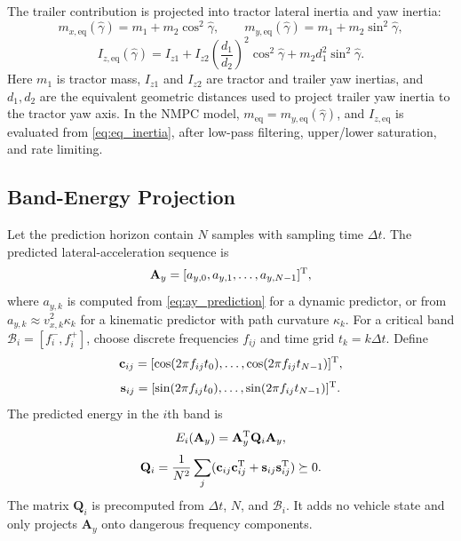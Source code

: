 The trailer contribution is projected into tractor lateral inertia and yaw inertia:
\begin{equation}
    m_{x,\mathrm{eq}}(\hat\gamma)=m_1+m_2\cos^2\hat\gamma,\qquad
    m_{y,\mathrm{eq}}(\hat\gamma)=m_1+m_2\sin^2\hat\gamma,
    \label{eq:eq_mass}
\end{equation}
\begin{equation}
    I_{z,\mathrm{eq}}(\hat\gamma)=I_{z1}
    +I_{z2}\left(\frac{d_1}{d_2}\right)^2\cos^2\hat\gamma
    +m_2d_1^2\sin^2\hat\gamma .
    \label{eq:eq_inertia}
\end{equation}
Here $m_1$ is tractor mass, $I_{z1}$ and $I_{z2}$ are tractor and trailer yaw inertias, and $d_1,d_2$ are the equivalent geometric distances used to project trailer yaw inertia to the tractor yaw axis. In the NMPC model, $m_{\mathrm{eq}}=m_{y,\mathrm{eq}}(\hat\gamma)$, and $I_{z,\mathrm{eq}}$ is evaluated from \eqref{eq:eq_inertia}, after low-pass filtering, upper/lower saturation, and rate limiting.

\subsection{Band-Energy Projection}
Let the prediction horizon contain $N$ samples with sampling time $\Delta t$. The predicted lateral-acceleration sequence is
\begin{equation}
    \mathbf{A}_y=[a_{y,0},a_{y,1},\ldots,a_{y,N-1}]^{\mathrm{T}} ,
\end{equation}
where $a_{y,k}$ is computed from \eqref{eq:ay_prediction} for a dynamic predictor, or from $a_{y,k}\approx v_{x,k}^2\kappa_k$ for a kinematic predictor with path curvature $\kappa_k$. For a critical band $\mathcal{B}_i=[f_i^-,f_i^+]$, choose discrete frequencies $f_{ij}$ and time grid $t_k=k\Delta t$. Define
\begin{equation}
    \mathbf{c}_{ij}=[\cos(2\pi f_{ij}t_0),\ldots,\cos(2\pi f_{ij}t_{N-1})]^{\mathrm{T}} ,
\end{equation}
\begin{equation}
    \mathbf{s}_{ij}=[\sin(2\pi f_{ij}t_0),\ldots,\sin(2\pi f_{ij}t_{N-1})]^{\mathrm{T}} .
\end{equation}
The predicted energy in the $i$th band is
\begin{equation}
    E_i(\mathbf{A}_y)=\mathbf{A}_y^{\mathrm{T}}\mathbf{Q}_i\mathbf{A}_y,
\end{equation}
\begin{equation}
    \mathbf{Q}_i=\frac{1}{N^2}\sum_j(\mathbf{c}_{ij}\mathbf{c}_{ij}^{\mathrm{T}}+\mathbf{s}_{ij}\mathbf{s}_{ij}^{\mathrm{T}})\succeq0 .
\end{equation}
The matrix $\mathbf{Q}_i$ is precomputed from $\Delta t$, $N$, and $\mathcal{B}_i$. It adds no vehicle state and only projects $\mathbf{A}_y$ onto dangerous frequency components.

